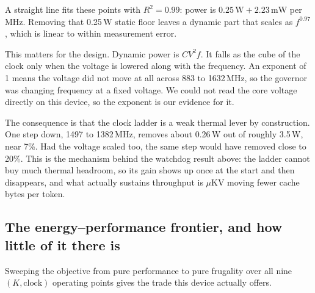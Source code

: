 \documentclass[11pt]{article}
\begin{document}
A straight line fits these points with $R^2=0.99$: power is $0.25\,\mathrm{W} + 2.23\,\mathrm{mW}$
per MHz. Removing that 0.25\,W static floor leaves a dynamic part that scales as $f^{0.97}$,
which is linear to within measurement error.

This matters for the design. Dynamic power is $C V^2 f$. It falls as the cube of the clock
only when the voltage is lowered along with the frequency. An exponent of 1 means the voltage
did not move at all across 883 to 1632\,MHz, so the governor was changing frequency at a fixed
voltage. We could not read the core voltage directly on this device, so the exponent is our
evidence for it.

The consequence is that the clock ladder is a weak thermal lever by construction. One step
down, 1497 to 1382\,MHz, removes about 0.26\,W out of roughly 3.5\,W, near 7\%. Had the
voltage scaled too, the same step would have removed close to 20\%. This is the mechanism
behind the watchdog result above: the ladder cannot buy much thermal headroom, so its gain
shows up once at the start and then disappears, and what actually sustains throughput is
$\mu$KV moving fewer cache bytes per token.

\subsection{The energy--performance frontier, and how little of it there is}
Sweeping the objective from pure performance to pure frugality over all nine
$(K,\text{clock})$ operating points gives the trade this device actually offers.
\end{document}
